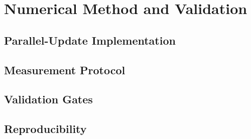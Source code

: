 \section{Numerical Method and Validation}

\subsection{Parallel-Update Implementation}

\subsection{Measurement Protocol}

\subsection{Validation Gates}

\subsection{Reproducibility}
